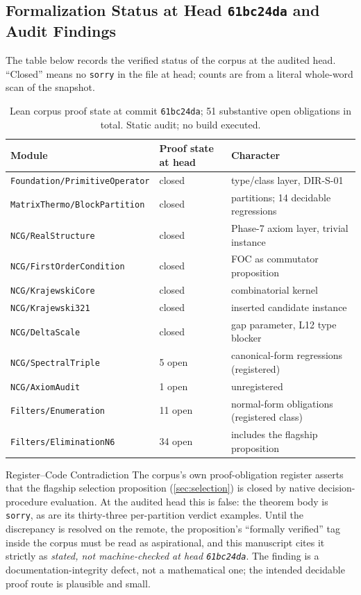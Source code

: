\documentclass[12pt,a4paper,twoside]{article}
\theoremstyle{plain}
\theoremstyle{definition}
\theoremstyle{remark}
\begin{document}
\subsection{Formalization Status at Head \texttt{61bc24da} and Audit Findings}
\label{subsec:formalization-status}

The table below records the verified status of the corpus at the audited
head. ``Closed'' means no \texttt{sorry} in the file at head; counts are
from a literal whole-word scan of the snapshot.

\begin{table}[H]
\centering\small
\begin{tabular}{@{}llp{5.2cm}@{}}
\toprule
Module & Proof state at head & Character \\
\midrule
\texttt{Foundation/PrimitiveOperator} & closed & type/class layer, DIR-S-01 \\
\texttt{MatrixThermo/BlockPartition} & closed & partitions; 14 decidable regressions \\
\texttt{NCG/RealStructure} & closed & Phase-7 axiom layer, trivial instance \\
\texttt{NCG/FirstOrderCondition} & closed & FOC as commutator proposition \\
\texttt{NCG/KrajewskiCore} & closed & combinatorial kernel \\
\texttt{NCG/Krajewski321} & closed & inserted candidate instance \\
\texttt{NCG/DeltaScale} & closed & gap parameter, L12 type blocker \\
\texttt{NCG/SpectralTriple} & 5 open & canonical-form regressions (registered) \\
\texttt{NCG/AxiomAudit} & 1 open & unregistered \\
\texttt{Filters/Enumeration} & 11 open & normal-form obligations (registered class) \\
\texttt{Filters/EliminationN6} & 34 open & includes the flagship proposition \\
\bottomrule
\end{tabular}
\caption{Lean corpus proof state at commit \texttt{61bc24da}; 51
substantive open obligations in total. Static audit; no build executed.}
\label{tab:lean-status}
\end{table}

\begin{probbox}{Register--Code Contradiction}
The corpus's own proof-obligation register asserts that the flagship
selection proposition (\cref{sec:selection}) is closed by native
decision-procedure evaluation. At the audited head this is false: the
theorem body is \texttt{sorry}, as are its thirty-three per-partition
verdict examples. Until the discrepancy is resolved on the remote, the
proposition's ``formally verified'' tag inside the corpus must be read as
aspirational, and this manuscript cites it strictly as \emph{stated, not
machine-checked at head \texttt{61bc24da}}. The finding is a
documentation-integrity defect, not a mathematical one; the intended
decidable proof route is plausible and small.
\end{probbox}
\end{document}
